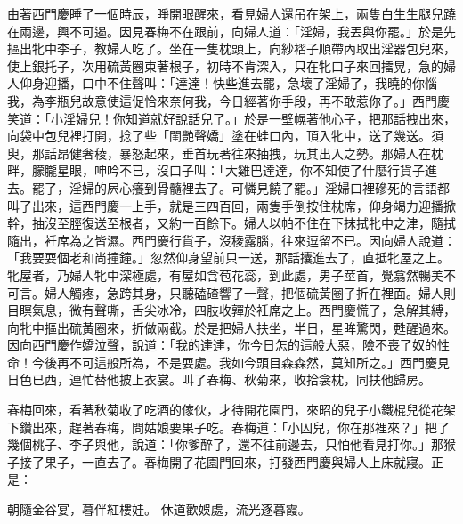 由著西門慶睡了一個時辰，睜開眼醒來，看見婦人還吊在架上，兩隻白生生腿兒蹺在兩邊，興不可遏。因見春梅不在跟前，向婦人道：「淫婦，我丟與你罷。」於是先摳出牝中李子，教婦人吃了。坐在一隻枕頭上，向紗褶子順帶內取出淫器包兒來，使上銀托子，次用硫黃圈束著根子，初時不肯深入，只在牝口子來回擂晃，急的婦人仰身迎播，口中不住聲叫：「達達！快些進去罷，急壞了淫婦了，我曉的你惱我，為李瓶兒故意使這促恰來奈何我，今日經著你手段，再不敢惹你了。」西門慶笑道：「小淫婦兒！你知道就好說話兒了。」於是一壁幌著他心子，把那話拽出來，向袋中包兒裡打開，捻了些「閨艷聲嬌」塗在蛙口內，頂入牝中，送了幾送。須臾，那話昂健奢稜，暴怒起來，垂首玩著往來抽拽，玩其出入之勢。那婦人在枕畔，朦朧星眼，呻吟不已，沒口子叫：「大雞巴達達，你不知使了什麼行貨子進去。罷了，淫婦的屄心癢到骨髓裡去了。可憐見饒了罷。」淫婦口裡磣死的言語都叫了出來，這西門慶一上手，就是三四百回，兩隻手倒按住枕席，仰身竭力迎播掀幹，抽沒至脛復送至根者，又約一百餘下。婦人以帕不住在下抹拭牝中之津，隨拭隨出，衽席為之皆濕。西門慶行貨子，沒稜露腦，往來逗留不已。因向婦人說道：「我要耍個老和尚撞鐘。」忽然仰身望前只一送，那話攮進去了，直抵牝屋之上。牝屋者，乃婦人牝中深極處，有屋如含苞花蕊，到此處，男子莖首，覺翕然暢美不可言。婦人觸疼，急跨其身，只聽磕碴響了一聲，把個硫黃圈子折在裡面。婦人則目瞑氣息，微有聲嘶，舌尖冰冷，四肢收嚲於衽席之上。西門慶慌了，急解其縛，向牝中摳出硫黃圈來，折做兩截。於是把婦人扶坐，半日，星眸驚閃，甦醒過來。因向西門慶作嬌泣聲，說道：「我的達達，你今日怎的這般大惡，險不喪了奴的性命！今後再不可這般所為，不是耍處。我如今頭目森森然，莫知所之。」西門慶見日色已西，連忙替他披上衣裳。叫了春梅、秋菊來，收拾衾枕，同扶他歸房。

春梅回來，看著秋菊收了吃酒的傢伙，才待開花園門，來昭的兒子小鐵棍兒從花架下鑽出來，趕著春梅，問姑娘要果子吃。春梅道：「小囚兒，你在那裡來？」把了幾個桃子、李子與他，說道：「你爹醉了，還不往前邊去，只怕他看見打你。」那猴子接了果子，一直去了。春梅開了花園門回來，打發西門慶與婦人上床就寢。正是：

朝隨金谷宴，暮伴紅樓娃。
休道歡娛處，流光逐暮霞。


